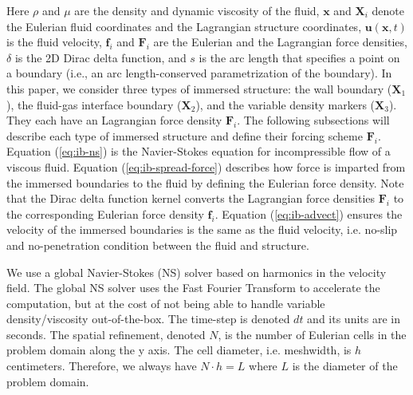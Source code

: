 \documentclass{jfm}
\begin{document}
Here $\rho$ and $\mu$ are the density and dynamic viscosity of the fluid, $\boldsymbol{x}$ and $\boldsymbol{X}_i$ denote the Eulerian fluid coordinates and the Lagrangian structure coordinates, $\boldsymbol{u}(\boldsymbol{x},t)$ is the fluid velocity, $\boldsymbol{f}_i$ and $\boldsymbol{F}_i$ are the Eulerian and the Lagrangian force densities, $\delta$ is the 2D Dirac delta function, and $s$ is the arc length that specifies a point on a boundary (i.e., an arc length-conserved parametrization of the boundary). In this paper, we consider three types of immersed structure: the wall boundary ($\bm{X}_1$), the fluid-gas interface boundary ($\bm{X}_2$), and the variable density markers ($\bm{X}_3$). They each have an Lagrangian force density $\boldsymbol{F}_i$. The following subsections will describe each type of immersed structure and define their forcing scheme $\boldsymbol{F}_i$. Equation (\ref{eq:ib-ns}) is the Navier-Stokes equation for incompressible flow of a viscous fluid. Equation (\ref{eq:ib-spread-force}) describes how force is imparted from the immersed boundaries to the fluid by defining the Eulerian force density.  Note that the Dirac delta function kernel converts the Lagrangian force densities $\bm{F}_i$ to the corresponding Eulerian force density $\bm{f}_i$. Equation (\ref{eq:ib-advect}) ensures the velocity of the immersed boundaries is the same as the fluid velocity, i.e. no-slip and no-penetration condition between the fluid and structure. 

We use a global Navier-Stokes (NS) solver based on harmonics in the velocity field. The global NS solver uses the Fast Fourier Transform to accelerate the computation, but at the cost of not being able to handle variable density/viscosity out-of-the-box. The time-step is denoted $dt$ and its units are in seconds. The spatial refinement, denoted $N$, is the number of Eulerian cells in the problem domain along the y axis. The cell diameter, i.e. meshwidth, is $h$ centimeters. Therefore, we always have $N \cdot h = L$ where $L$ is the diameter of the problem domain. 
\end{document}
